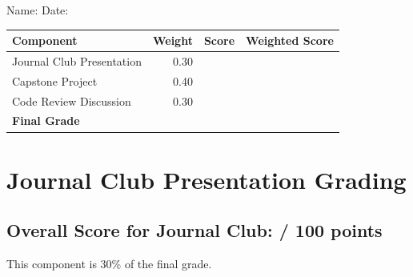 \documentclass{article}
\begin{document}
\begin{flushleft} 
Name: \underline{\hspace{6cm}} \hspace{1.1cm} Date: \underline{\hspace{6cm}} \\ 
\end{flushleft}

\begin{center}
\begin{tabular}{@{}l r r r@{}}
\toprule
Component & Weight & Score  & Weighted Score \\
\midrule
Journal Club Presentation & 0.30 & \underline{\hspace{1.5cm}} & \underline{\hspace{1.5cm}} \\
Capstone Project & 0.40 & \underline{\hspace{1.5cm}} & \underline{\hspace{1.5cm}} \\
Code Review Discussion & 0.30 & \underline{\hspace{1.5cm}} & \underline{\hspace{1.5cm}} \\
\midrule[\heavyrulewidth]
\textbf{Final Grade} &  & &  \\
\bottomrule
\end{tabular}
\end{center}

\vspace{1em}
\hrulefill
\vspace{1em}

\section{Journal Club Presentation Grading}
\subsection*{Overall Score for Journal Club: \underline{\hspace{1.5cm}} / 100 points }
This component is 30\% of the final grade.
\end{document}
